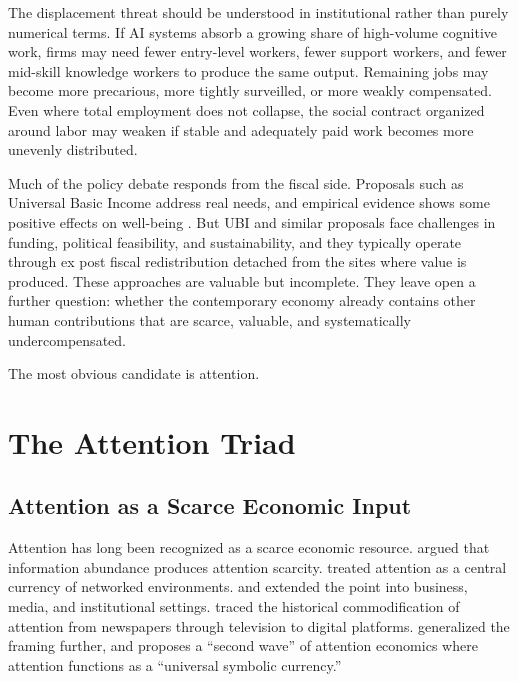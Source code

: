 \documentclass[12pt, a4paper]{article}
\begin{document}
The displacement threat should be understood in institutional rather than purely numerical terms. If AI systems absorb a growing share of high-volume cognitive work, firms may need fewer entry-level workers, fewer support workers, and fewer mid-skill knowledge workers to produce the same output. Remaining jobs may become more precarious, more tightly surveilled, or more weakly compensated. Even where total employment does not collapse, the social contract organized around labor may weaken if stable and adequately paid work becomes more unevenly distributed.

Much of the policy debate responds from the fiscal side. Proposals such as Universal Basic Income \citep{standing2017, yang2018} address real needs, and empirical evidence shows some positive effects on well-being \citep{kangas2019}. But UBI and similar proposals face challenges in funding, political feasibility, and sustainability, and they typically operate through ex post fiscal redistribution detached from the sites where value is produced. These approaches are valuable but incomplete. They leave open a further question: whether the contemporary economy already contains other human contributions that are scarce, valuable, and systematically undercompensated.

The most obvious candidate is attention.


\section{The Attention Triad}
\label{sec:triad}

\subsection{Attention as a Scarce Economic Input}
\label{sec:triad-scarce}

Attention has long been recognized as a scarce economic resource. \citet{simon1971} argued that information abundance produces attention scarcity. \citet{goldhaber1997} treated attention as a central currency of networked environments. \citet{davenport2001} and \citet{lanham2006} extended the point into business, media, and institutional settings. \citet{wu2016} traced the historical commodification of attention from newspapers through television to digital platforms. \citet{citton2017} generalized the framing further, and \citet{heitmayer2024} proposes a ``second wave'' of attention economics where attention functions as a ``universal symbolic currency.''
\end{document}
